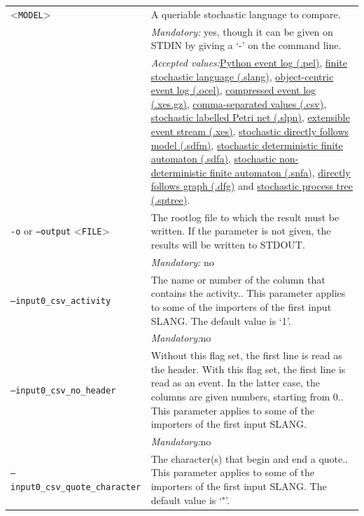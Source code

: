 {\begin{tabularx}{\linewidth}{lX}
<\texttt{MODEL}>&A queriable stochastic language to compare.\\
&\textit{Mandatory:} \quad yes, though it can be given on STDIN by giving a `-' on the command line.\\
&\textit{Accepted values:}\quad \hyperref[filehandler:Python event log]{Python event log (.pel)}, \hyperref[filehandler:finite stochastic language]{finite stochastic language (.slang)}, \hyperref[filehandler:object-centric event log]{object-centric event log (.ocel)}, \hyperref[filehandler:compressed event log]{compressed event log (.xes.gz)}, \hyperref[filehandler:comma-separated values]{comma-separated values (.csv)}, \hyperref[filehandler:stochastic labelled Petri net]{stochastic labelled Petri net (.slpn)}, \hyperref[filehandler:extensible event stream]{extensible event stream (.xes)}, \hyperref[filehandler:stochastic directly follows model]{stochastic directly follows model (.sdfm)}, \hyperref[filehandler:stochastic deterministic finite automaton]{stochastic deterministic finite automaton (.sdfa)}, \hyperref[filehandler:stochastic non-deterministic finite automaton]{stochastic non-deterministic finite automaton (.snfa)}, \hyperref[filehandler:directly follows graph]{directly follows graph (.dfg)} and \hyperref[filehandler:stochastic process tree]{stochastic process tree (.sptree)}.\\
\texttt{-o} or \texttt{--output} <\texttt{FILE}> &
The rootlog file to which the result must be written. If the parameter is not given, the results will be written to STDOUT.\\
&\textit{Mandatory:} \quad no\\
\texttt{--input0\_csv\_activity} & The name or number of the column that contains the activity.. This parameter applies to some of the importers of the first input SLANG. The default value is `1'.\\
&\textit{Mandatory:}\quad no\\
\texttt{--input0\_csv\_no\_header} & Without this flag set, the first line is read as the header. 
    With this flag set, the first line is read as an event. In the latter case, the columns are given numbers, starting from 0.. This parameter applies to some of the importers of the first input SLANG. \\
&\textit{Mandatory:}\quad no\\
\texttt{--input0\_csv\_quote\_character} & The character(s) that begin and end a quote.. This parameter applies to some of the importers of the first input SLANG. The default value is `"'.\\

\end{tabularx}}
